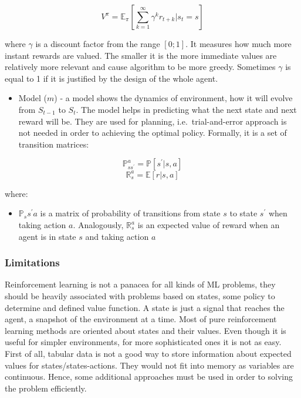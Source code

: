 \documentclass[]{article}
\providecommand{\tightlist}{%
  \setlength{\itemsep}{0pt}\setlength{\parskip}{0pt}}
\begin{document}
\[V^\pi=\mathbb{E}_\pi[\sum\limits_{k=1}^\infty \gamma^kr_{t+k}|s_t=s]\]

where \(\gamma\) is a discount factor from the range \([0; 1]\). It
measures how much more instant rewards are valued. The smaller it is the
more immediate values are relatively more relevant and cause algorithm
to be more greedy. Sometimes \(\gamma\) is equal to 1 if it is justified
by the design of the whole agent.

\begin{itemize}
\tightlist
\item
  Model (\(m\)) - a model shows the dynamics of environment, how it will
  evolve from \(S_{t-1}\) to \(S_t\). The model helps in predicting what
  the next state and next reward will be. They are used for planning,
  i.e.~trial-and-error approach is not needed in order to achieving the
  optimal policy. Formally, it is a set of transition matrices:
\end{itemize}

\[\mathbb{P}_{ss^{'}}^a=\mathbb{P}[s^{'}|s,a]\]
\[\mathbb{R}_s^a=\mathbb{E}[r|s,a]\]

where:

\begin{itemize}
\tightlist
\item
  \(\mathbb{P}_ss^{'}{a}\) is a matrix of probability of transitions
  from state \(s\) to state \(s^{'}\) when taking action \(a\).
  Analogously, \(\mathbb{R}_{s}^a\) is an expected value of reward when
  an agent is in state \(s\) and taking action \(a\)
\end{itemize}

\subsubsection{Limitations}\label{limitations}

Reinforcement learning is not a panacea for all kinds of ML problems,
they should be heavily associated with problems based on states, some
policy to determine and defined value function. A state is just a signal
that reaches the agent, a snapshot of the environment at a time. Most of
pure reinforcement learning methods are oriented about states and their
values. Even though it is useful for simpler environments, for more
sophisticated ones it is not as easy. First of all, tabular data is not
a good way to store information about expected values for
states/states-actions. They would not fit into memory as variables are
continuous. Hence, some additional approaches must be used in order to
solving the problem efficiently.
\end{document}
